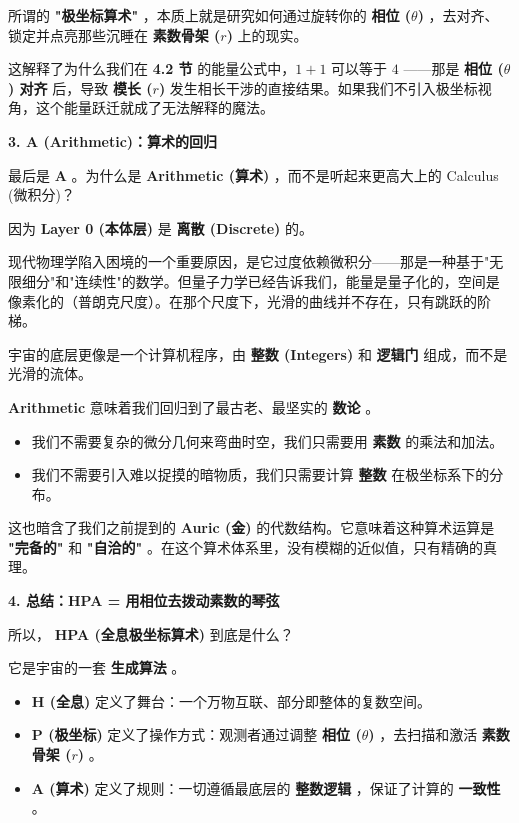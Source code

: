 所谓的 \textbf{"极坐标算术"} ，本质上就是研究如何通过旋转你的 \textbf{相位 ($\theta$)} ，去对齐、锁定并点亮那些沉睡在 \textbf{素数骨架 ($r$)} 上的现实。

这解释了为什么我们在 \textbf{4.2 节} 的能量公式中，$1 + 1$ 可以等于 $4$ ——那是 \textbf{相位 ($\theta$) 对齐} 后，导致 \textbf{模长 ($r$)} 发生相长干涉的直接结果。如果我们不引入极坐标视角，这个能量跃迁就成了无法解释的魔法。

\textbf{3. A (Arithmetic)：算术的回归}

最后是 \textbf{A} 。为什么是 \textbf{Arithmetic (算术)} ，而不是听起来更高大上的 Calculus (微积分)？

因为 \textbf{Layer 0 (本体层)} 是 \textbf{离散 (Discrete)} 的。

现代物理学陷入困境的一个重要原因，是它过度依赖微积分——那是一种基于"无限细分"和"连续性"的数学。但量子力学已经告诉我们，能量是量子化的，空间是像素化的（普朗克尺度）。在那个尺度下，光滑的曲线并不存在，只有跳跃的阶梯。

宇宙的底层更像是一个计算机程序，由 \textbf{整数 (Integers)} 和 \textbf{逻辑门} 组成，而不是光滑的流体。

\textbf{Arithmetic} 意味着我们回归到了最古老、最坚实的 \textbf{数论} 。

\begin{itemize}
\item 我们不需要复杂的微分几何来弯曲时空，我们只需要用 \textbf{素数} 的乘法和加法。
\item 我们不需要引入难以捉摸的暗物质，我们只需要计算 \textbf{整数} 在极坐标系下的分布。
\end{itemize}

这也暗含了我们之前提到的 \textbf{Auric (金)} 的代数结构。它意味着这种算术运算是 \textbf{"完备的"} 和 \textbf{"自洽的"} 。在这个算术体系里，没有模糊的近似值，只有精确的真理。

\textbf{4. 总结：HPA = 用相位去拨动素数的琴弦}

所以， \textbf{HPA (全息极坐标算术)} 到底是什么？

它是宇宙的一套 \textbf{生成算法} 。

\begin{itemize}
\item \textbf{H (全息)} 定义了舞台：一个万物互联、部分即整体的复数空间。
\item \textbf{P (极坐标)} 定义了操作方式：观测者通过调整 \textbf{相位 ($\theta$)} ，去扫描和激活 \textbf{素数骨架 ($r$)} 。
\item \textbf{A (算术)} 定义了规则：一切遵循最底层的 \textbf{整数逻辑} ，保证了计算的 \textbf{一致性} 。
\end{itemize}

